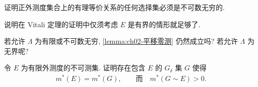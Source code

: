 \documentclass[../../main.tex]{subfiles}
\begin{document}
\begin{exercise}\label{exercise:ch02-30}
证明正外测度集合上的有理等价关系的任何选择集必须是不可数无穷的.
\end{exercise}

\begin{exercise}\label{exercise:ch02-31}
说明在 Vitali 定理的证明中仅须考虑 $E$ 是有界的情形就足够了.
\end{exercise}

\begin{exercise}\label{exercise:ch02-32}
若允许 $\Lambda$ 为有限或不可数无穷, \cref{lemma:ch02-平移零测} 仍然成立吗? 若允许 $\Lambda$ 为无界呢?
\end{exercise}

\begin{exercise}\label{exercise:ch02-33}
令 $E$ 为有限外测度的不可测集. 证明存在包含 $E$ 的 $G_{\delta}$ 集 $G$ 使得
\begin{align*}
m^{*}(E)=m^{*}(G),\qquad\text{而}\quad m^{*}(G\sim E)>0.
\end{align*}
\end{exercise}
\end{document}
